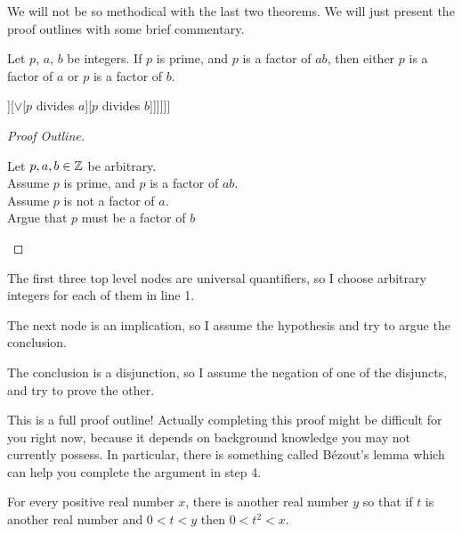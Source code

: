  

We will not be so methodical with the last two theorems.  We will just present the proof outlines with some brief commentary.

\begin{theorem}
		Let $p$, $a$, $b$ be integers.  If $p$ is prime, and $p$ is a factor of $ab$, then either $p$ is a factor of $a$ or $p$ is a factor of $b$.
	\end{theorem}

\begin{center}
		\begin{forest}
				[$\forall p$[$\forall a$[$\forall b$[$\implies$[$\wedge$[$p$ is prime][$p$ divides $ab$]][$\vee$[$p$ divides $a$][$p$ divides $b$]]]]]]
			\end{forest}
	\end{center}

\begin{proof}[Proof Outline]
	
			\leavevmode\newline
		\begin{fitch}
				\textrm{Let $p, a, b \in \mathbb{Z}$ be arbitrary.}\\
				\textrm{Assume $p$ is prime, and $p$ is a factor of $ab$.}\\
				\fa \textrm{Assume $p$ is not a factor of $a$.}\\
				\fa \fa \textrm{Argue that $p$ must be a factor of $b$}
			\end{fitch}
		
	\end{proof}

The first three top level nodes are universal quantifiers, so I choose arbitrary integers for each of them in line 1.

The next node is an implication, so I assume the hypothesis and try to argue the conclusion.

The conclusion is a disjunction, so I assume the negation of one of the disjuncts, and try to prove the other.

This is a full proof outline!  Actually completing this proof might be difficult for you right now, because it depends on background knowledge you may not currently possess.  In particular, there is something called Bézout's lemma which can help you complete the argument in step 4.

 \medskip
 
\begin{theorem}	
	For every positive real number $x$, there is another real number $y$ so that if $t$ is another real number and $0<t<y$ then $0<t^2<x$.
	\end{theorem}



